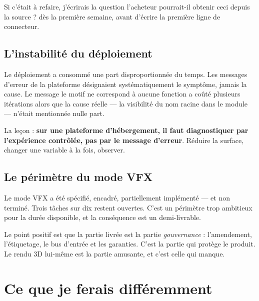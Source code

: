 Si c'était à refaire, j'écrirais la question \og l'acheteur pourrait-il obtenir
ceci depuis la source ? \fg{} dès la première semaine, avant d'écrire la
première ligne de connecteur.

\subsection{L'instabilité du déploiement}

Le déploiement a consommé une part disproportionnée du temps. Les messages
d'erreur de la plateforme désignaient systématiquement le symptôme, jamais la
cause. Le message \og le motif ne correspond à aucune fonction \fg{} a coûté
plusieurs itérations alors que la cause réelle — la visibilité du nom racine
dans le module — n'était mentionnée nulle part.

La leçon : \textbf{sur une plateforme d'hébergement, il faut diagnostiquer par
l'expérience contrôlée, pas par le message d'erreur}. Réduire la surface,
changer une variable à la fois, observer.

\subsection{Le périmètre du mode VFX}

Le mode VFX a été spécifié, encadré, partiellement implémenté — et non terminé.
Trois tâches sur dix restent ouvertes. C'est un périmètre trop ambitieux pour
la durée disponible, et la conséquence est un demi-livrable.

Le point positif est que la partie livrée est la partie \emph{gouvernance} :
l'amendement, l'étiquetage, le bus d'entrée et les garanties. C'est la partie
qui protège le produit. Le rendu 3D lui-même est la partie amusante, et c'est
celle qui manque.

\section{Ce que je ferais différemment}

